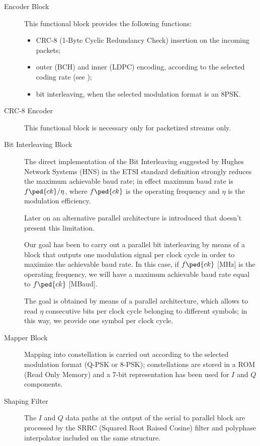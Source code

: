\begin{description}
\item[Encoder Block] This functional block provides the following functions:
    \begin{itemize}
    \item 	CRC-8 (1-Byte Cyclic Redundancy Check) insertion on the incoming packets;
    \item outer (BCH) and inner (LDPC) encoding, according to the selected coding rate (see );
    \item bit interleaving, when the selected modulation format is an 8PSK.
    \end{itemize}

\item[CRC-8 Encoder] This functional block is necessary only for packetized streams only.

\item[Bit Interleaving Block] The direct implementation of the Bit Interleaving suggested by Hughes Network Systems (HNS) in the ETSI standard definition strongly reduces the maximum achievable baud rate; in effect maximum baud rate is \(f\ped{ck}/\eta\), where \(f\ped{ck}\) is the operating frequency and \(\eta\) is the modulation efficiency.

    Later on an alternative parallel architecture is introduced that doesn't present this limitation.

    Our goal has been to carry out a parallel bit interleaving by means of a block that outputs one modulation signal per clock cycle in order to maximize the achievable baud rate. In this case, if \(f\ped{ck}\) [MHz] is the operating frequency, we will have a maximum achievable baud rate equal to \(f\ped{ck}\) [MBaud].

    The goal is obtained by means of a parallel architecture, which allows to read \(\eta\) consecutive bits per clock cycle belonging to different symbols; in this way, we provide one symbol per clock cycle.

\item[Mapper Block] Mapping into constellation is carried out according to the selected modulation format (Q-PSK or 8-PSK); constellations are stored in a ROM (Read Only Memory) and a 7-bit representation has been used for \(I\) and \(Q\) components.

\item[Shaping Filter] The \(I\) and \(Q\) data paths at the output of the serial to parallel block are processed by the SRRC (Squared Root Raised Cosine) filter and polyphase interpolator included on the same structure.


\end{description}
